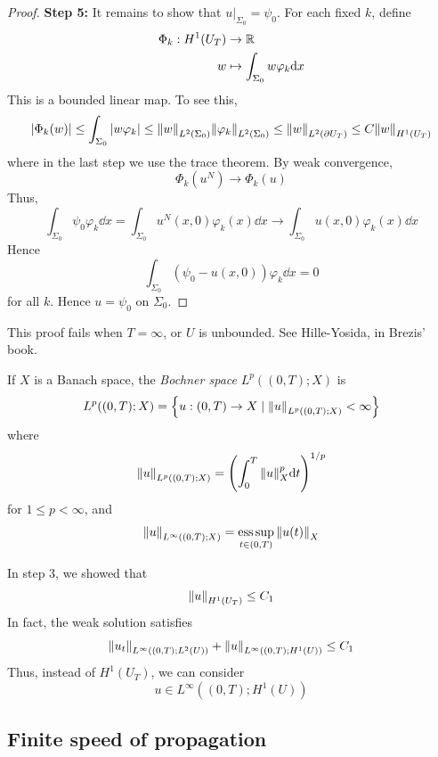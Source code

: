 \documentclass{article}
\begin{document}
\begin{proof}
    \textbf{Step 5:} It remains to show that \(u\vert_{\Sigma_0} = \psi_0\). For each fixed \(k\), define
    \begin{align*}
        \Phi_k : H^1(U_T) &\to \mathbb{R} \\
        w &\mapsto \int_{\Sigma_0}w\varphi_k\dd x
    \end{align*}
    This is a bounded linear map. To see this,
    \[\abs{\Phi_k(w)} \le \int_{\Sigma_0}\abs{w\varphi_k} \le \norm{w}_{L^2(\Sigma_0)}\norm{\varphi_k}_{L^2(\Sigma_0)} \le \norm{w}_{L^2(\partial U_T)} \le C\norm{w}_{H^1(U_T)}\]
    where in the last step we use the trace theorem. By weak convergence,
    \[\Phi_k(u^N) \to \Phi_k(u)\]
    Thus,
    \[\int_{\Sigma_0}\psi_0 \varphi_k\dd x = \int_{\Sigma_0}u^N(x, 0)\varphi_k(x)\dd x \to \int_{\Sigma_0}u(x, 0)\varphi_k(x)\dd x\]
    Hence
    \[\int_{\Sigma_0}\left(\psi_0 - u(x, 0)\right)\varphi_k \dd x = 0\]
    for all \(k\). Hence \(u = \psi_0\) on \(\Sigma_0\).
\end{proof}

\begin{remark}
    This proof fails when \(T = \infty\), or \(U\) is unbounded. See Hille-Yosida, in Brezis' book.
\end{remark}

\begin{definition}
    If \(X\) is a Banach space, the \emph{Bochner space} \(L^p((0, T); X)\) is 
    \begin{align*}
        L^p((0, T); X) = \left\{u : (0, T) \to X \mid \norm{u}_{L^p((0, T); X)} < \infty\right\}
    \end{align*}
    where
    \[\norm{u}_{L^p((0, T); X)} = \left(\int_0^T \norm{u}_X^p \dd t\right)^{1/p}\]
    for \(1 \le p < \infty\), and
    \[\norm{u}_{L^\infty((0, T); X)} = \operatorname*{ess\,sup}_{t \in (0, T)}\norm{u(t)}_X\]
\end{definition}

\begin{remark}
    In step 3, we showed that
    \[\norm{u}_{H^1(U_T)} \le C_1\]
    In fact, the weak solution satisfies
    \[\norm{u_t}_{L^\infty((0, T); L^2(U))} + \norm{u}_{L^\infty((0, T); H^1(U))} \le C_1\]
    Thus, instead of \(H^1(U_T)\), we can consider
    \[u \in L^\infty((0, T); H^1(U))\]
\end{remark}

\subsection{Finite speed of propagation}
\end{document}
